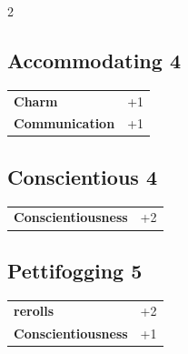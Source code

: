 \begin{multicols}{2}
\begin{tcolorbox}
    \subsection*{Accommodating \hfill \small{4 }}
    \tcblower




\begin{tabular}{@{}ll@{}}
    \textbf{Charm} & +1\\
    \textbf{Communication} & +1\\
\end{tabular}


\end{tcolorbox}

\begin{tcolorbox}
    \subsection*{Conscientious \hfill \small{4 }}
    \tcblower




\begin{tabular}{@{}ll@{}}
    \textbf{Conscientiousness} & +2\\
\end{tabular}


\end{tcolorbox}

\begin{tcolorbox}
    \subsection*{Pettifogging \hfill \small{5 }}
    \tcblower




\begin{tabular}{@{}ll@{}}
    \textbf{rerolls} & +2\\
    \textbf{Conscientiousness} & +1\\
\end{tabular}



\end{tcolorbox}
\end{multicols}
